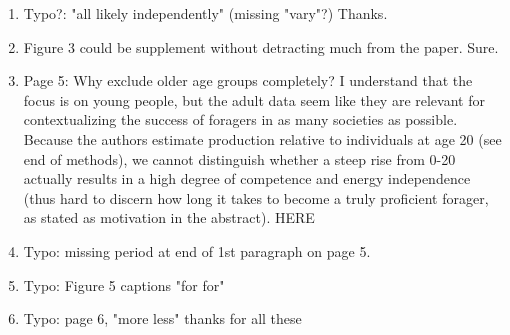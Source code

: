 \documentclass{article}
\newcommand{\rev}[1]{{\color{ForestGreen}#1}}
\begin{document}
\begin{enumerate}
    \item Typo?: "all likely independently" (missing "vary"?) \rev{Thanks.}
    
    \item Figure 3 could be supplement without detracting much from the paper. \rev{Sure.}
    
    \item Page 5: Why exclude older age groups completely? I understand that the focus is on young people, but the adult data seem like they are relevant for contextualizing the success of foragers  in as many societies as possible. Because the authors estimate production relative to individuals at age 20 (see end of methods), we cannot distinguish whether a steep rise from 0-20 actually  results in a high degree of competence and energy independence (thus hard to discern how long  it takes to become a truly proficient forager, as stated as motivation in the abstract). \rev{HERE}
    
    \item Typo: missing period at end of 1st paragraph on page 5.
    \item Typo: Figure 5 captions "for for" 
    \item Typo: page 6, "more less" 
    \rev{thanks for all these}


\end{enumerate}
\end{document}
